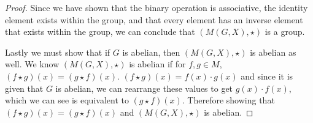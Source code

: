 \begin{proof}
Since we have shown that the binary operation is associative, the identity element exists within the group, and that  every element has an inverse element that exists within the group, we can conclude that $(M(G, X), \star)$ is a group.

Lastly we must show that if $G$ is abelian, then $(M(G, X), \star)$ is abelian as well. We know $(M(G, X), \star)$ is abelian if for $f,g\in M$, $(f \star g) (x) = (g \star f) (x)$.
$(f \star g) (x) = f(x) \cdot g(x)$ and since it is given that $G$ is abelian, we can rearrange these values to get $ g(x) \cdot f(x)$, which we can see is equivalent to $(g \star f) (x)$. Therefore showing that $(f \star g) (x) = (g \star f) (x)$ and $(M(G, X), \star)$ is abelian.
\end{proof}
